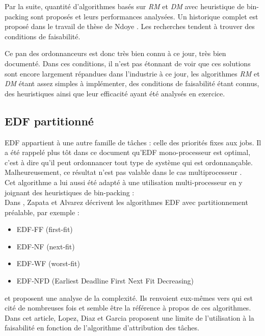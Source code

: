 \documentclass[11pt,a4paper,oneside]{report}
\begin{document}
Par la suite, quantité d'algorithmes basés sur \textit{RM} et \textit{DM} avec 
heuristique de bin-packing sont proposés et leurs performances analysées. 
Un historique complet est proposé dans le travail de thèse de Ndoye \cite{ndoye_ordonnancement_2014}. 
Les recherches tendent à trouver des conditions de faisabilité.

Ce pan des ordonnanceurs est donc très bien connu à ce jour, très bien documenté. 
Dans ces conditions, il n'est pas étonnant de voir que ces solutions sont encore largement 
répandues dans l'industrie à ce jour, les algorithmes \textit{RM} et \textit{DM} 
étant assez simples à implémenter, des conditions de faisabilité étant connus, 
des heuristiques ainsi que leur efficacité ayant été analysés en exercice.\\

\subsection{EDF partitionné}
EDF appartient à une autre famille de tâches : celle des priorités fixes aux jobs. 
Il a été rappelé plus tôt dans ce document qu'EDF mono-processeur est optimal, 
c'est à dire qu'il peut ordonnancer tout type de système qui est ordonnançable. 
Malheureusement, ce résultat n'est pas valable dans le cas multiprocesseur \cite{dertouzos_multiprocessor_1989}.\\

Cet algorithme a lui aussi été adapté à une utilisation multi-processeur en y joignant 
des heuristiques de bin-packing : \\
Dans \cite{pereira_zapata_edf_2005}, Zapata et Alvarez décrivent les algorithmes 
EDF avec partitionnement préalable, par exemple : \\
\begin{itemize}
	\item EDF-FF (first-fit)
	\item EDF-NF (next-fit)
	\item EDF-WF (worst-fit)
	\item EDF-NFD (Earliest Deadline First Next Fit Decreasing)
\end{itemize}
et proposent une analyse de la complexité. Ils renvoient eux-mêmes vers 
\cite{lopez_utilization_2004} 
qui est cité de nombreuses fois et semble être la référence à propos de ces algorithmes. 
Dans cet article, Lopez, Diaz et Garcia proposent une limite de l'utilisation à la 
faisabilité en fonction de l'algorithme d'attribution des tâches. 
\end{document}
